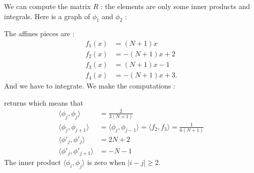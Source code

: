We can compute the matrix \( R\) : the elements are only some inner products and integrals. Here is a graph of \( \phi_1\) and \( \phi_2\) :
\begin{center}
   
\end{center}
The affines pieces are :
\begin{subequations}
    \begin{align}
        f_1(x)&=(N+1)x\\
        f_2(x)&=-(N+1)x+2\\
        f_3(x)&=(N+1)x-1\\
        f_4(x)&=-(N+1)x+3.
    \end{align}
\end{subequations}
And we have to integrate. We make the computations :

returns
which means that
\begin{subequations}
    \begin{align}
        \langle \phi_j, \phi_j\rangle &=\frac{ 2 }{ 3(N+1) }\\
        \langle \phi_j, \phi_{j+1}\rangle&=\langle \phi_j, \phi_{j-1}\rangle =\langle f_2, f_3\rangle =\frac{1}{ 6(N+1) }\\
        \langle \phi'_j, \phi'_j\rangle &=2N+2\\
        \langle \phi'_j, \phi'_{j+1}\rangle &=-N-1
    \end{align}
\end{subequations}
The inner product \( \langle \phi_i, \phi_j\rangle \) is zero when \( | i-j |\geq 2\). 



